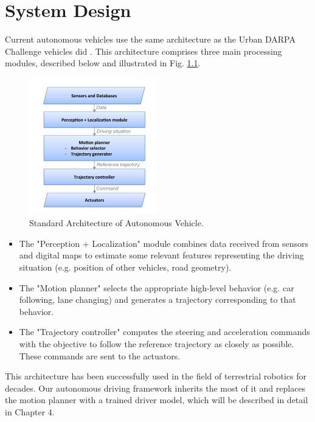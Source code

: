 \chapter{System Design}


Current autonomous vehicles use the same architecture as the Urban DARPA Challenge vehicles did \cite{DARPA2009} \cite{FullyAD} \cite{BerthaDrive2014} \cite{PROUD2014}. This architecture comprises three main processing modules, described below and illustrated in Fig. \ref{fig:std-archi}.

\begin{figure}[h]
\centering
\includegraphics[width=0.5\textwidth]{figs/ch3/standard-architecture}
\caption{Standard Architecture of Autonomous Vehicle.}
\label{fig:std-archi}
\end{figure}

\begin{itemize}
\item The "Perception + Localization" module combines data received from sensors and digital maps to estimate some relevant features representing the driving situation (e.g. position of other vehicles, road geometry).
\item The "Motion planner" selects the appropriate high-level behavior (e.g. car following, lane changing) and generates a trajectory corresponding to that behavior.
\item The "Trajectory controller" computes the steering and acceleration commands with the objective to follow the reference trajectory as closely as possible. These commands are sent to the actuators.
\end{itemize}

This architecture has been successfully used in the field of terrestrial robotics for decades. Our autonomous driving framework inherits the most of it and replaces the motion planner with a trained driver model, which will be described in detail in Chapter 4.

